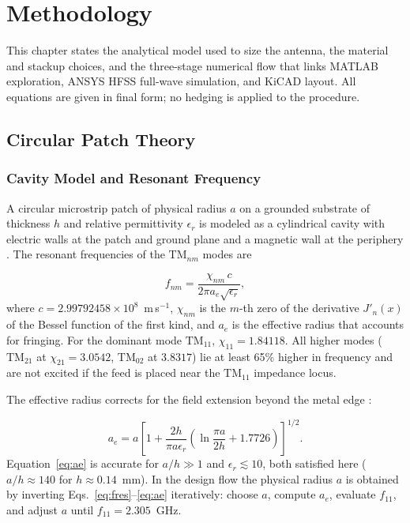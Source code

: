 %
%
%
%

\chapter{Methodology}

This chapter states the analytical model used to size the antenna, the material and stackup choices, and the three-stage numerical flow that links MATLAB exploration, ANSYS HFSS full-wave simulation, and KiCAD layout. All equations are given in final form; no hedging is applied to the procedure.

\section{Circular Patch Theory}

\subsection{Cavity Model and Resonant Frequency}

A circular microstrip patch of physical radius $a$ on a grounded substrate of thickness $h$ and relative permittivity $\epsilon_r$ is modeled as a cylindrical cavity with electric walls at the patch and ground plane and a magnetic wall at the periphery \cite{balanis2005antenna, garg2001microstrip}. The resonant frequencies of the $\mathrm{TM}_{nm}$ modes are

\begin{equation}
    f_{nm} = \frac{\chi_{nm} \, c}{2\pi a_e \sqrt{\epsilon_r}} ,
    \label{eq:fres}
\end{equation}
where $c = 2.99792458\times10^{8}$~m\,s$^{-1}$, $\chi_{nm}$ is the $m$-th zero of the derivative $J'_n(x)$ of the Bessel function of the first kind, and $a_e$ is the effective radius that accounts for fringing. For the dominant mode $\mathrm{TM}_{11}$, $\chi_{11}=1.84118$. All higher modes ($\mathrm{TM}_{21}$ at $\chi_{21}=3.0542$, $\mathrm{TM}_{02}$ at $3.8317$) lie at least 65\% higher in frequency and are not excited if the feed is placed near the $\mathrm{TM}_{11}$ impedance locus.

The effective radius corrects for the field extension beyond the metal edge \cite{shen1979resonant, hammerstad1975equations}:

\begin{equation}
    a_e = a \left[ 1 + \frac{2h}{\pi a \epsilon_r}\left( \ln\frac{\pi a}{2h} + 1.7726 \right) \right]^{1/2} .
    \label{eq:ae}
\end{equation}
Equation~\ref{eq:ae} is accurate for $a/h \gg 1$ and $ \epsilon_r \lesssim 10$, both satisfied here ($a/h \approx 140$ for $h\approx 0.14$~mm). In the design flow the physical radius $a$ is obtained by inverting Eqs.~\ref{eq:fres}--\ref{eq:ae} iteratively: choose $a$, compute $a_e$, evaluate $f_{11}$, and adjust $a$ until $f_{11}=2.305$~GHz.

